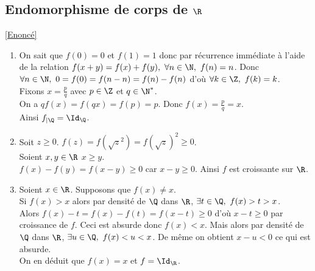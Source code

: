 \documentclass[8pt]{book}
\begin{document}
	\subsection{Endomorphisme de corps de $\R$ }
	\label{Endomorphisme de corps de R corrigé}
	\textcolor{blue}{\hyperref[Endomorphisme de corps de R]{[Enoncé]}}\\
	\begin{enumerate}[leftmargin=*]
		\item On sait que $f(0)=0$ et $f(1)=1$ donc par récurrence immédiate à l'aide de la relation $f(x+y)=f(x)+f(y),\ \forall n\in \N,\ f(n)=n$. Donc $\forall n\in \N,\ 0=f(0)=f(n-n)=f(n)-f(n)$ d'où $\forall k\in \Z,\ f(k)=k$.\\
		Fixons $x=\displaystyle\frac{p}{q}$ avec $p\in \Z$ et $q\in \N^*$.\\
		On a $qf(x)=f(qx)=f(p)=p$. Donc $f(x)=\displaystyle\frac{p}{q}=x$.\\
		Ainsi $f_{|\Q}=\Id_\Q$.
		\item Soit $z\geq 0$. $f(z)=f({\sqrt z}^2)=f(\sqrt z)^2\geq 0$.\\
		Soient $x,y\in \R$ $x\geq y$.\\
		$f(x)-f(y)=f(x-y)\geq 0$ car $x-y\geq 0$. Ainsi $f$ est croissante sur $\R$.
		\item Soient $x\in \R$. Supposons que $f(x)\ne x$.\\
		Si $f(x)>x$ alors par densité de $\Q$ dans $\R$, $\exists t\in \Q,\ f(x)>t>x$.\\
		Alors $f(x)-t=f(x)-f(t)=f(x-t)\geq 0$ d'où $x-t\geq 0$ par croissance de $f$. Ceci est absurde donc $f(x)<x$. Mais alors par densité de $\Q$ dans $\R$, $\exists u\in \Q,\ f(x)<u<x$. De même on obtient $x-u<0$ ce qui est absurde.\\
		On en déduit que $f(x)=x$ et $f=\Id_\R$.
	\end{enumerate}
	
\end{document}
